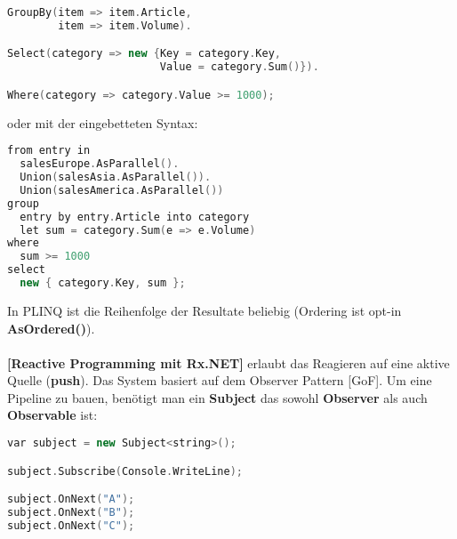 \documentclass[8pt]{extarticle}
\let\oldtextbf\textbf
\renewcommand{\textbf}{\tiny\oldtextbf}
\begin{document}
\begin{multicols*}{5}
\begin{lstlisting}[language=c++]
GroupBy(item => item.Article,
        item => item.Volume).

Select(category => new {Key = category.Key,
                        Value = category.Sum()}).

Where(category => category.Value >= 1000);
\end{lstlisting}
oder mit der eingebetteten Syntax:
\begin{lstlisting}[language=c++]
from entry in
  salesEurope.AsParallel().
  Union(salesAsia.AsParallel()).
  Union(salesAmerica.AsParallel())
group
  entry by entry.Article into category
  let sum = category.Sum(e => e.Volume)
where
  sum >= 1000
select
  new { category.Key, sum };
\end{lstlisting}
In PLINQ ist die Reihenfolge der Resultate beliebig (Ordering ist opt-in \textbf{AsOrdered()}).\\\\
\textbf{[Reactive Programming mit Rx.NET]} erlaubt das Reagieren auf eine aktive Quelle (\textbf{push}). Das System basiert auf dem Observer Pattern [GoF]. Um eine Pipeline zu bauen, benötigt man ein \textbf{Subject} das sowohl \textbf{Observer} als auch \textbf{Observable} ist:
\begin{lstlisting}[language=c++]
var subject = new Subject<string>();

subject.Subscribe(Console.WriteLine);

subject.OnNext("A");
subject.OnNext("B");
subject.OnNext("C");


\end{lstlisting}
\end{multicols*}
\end{document}

